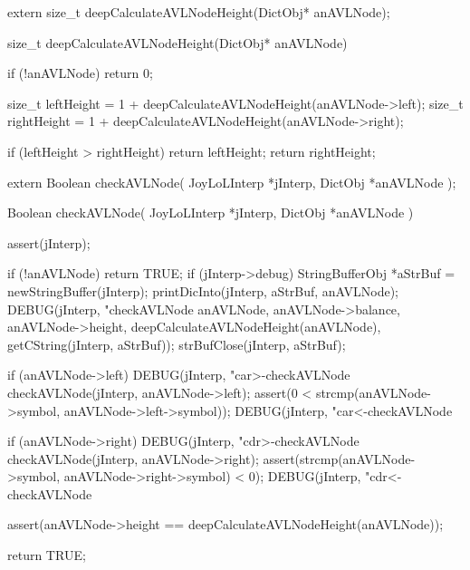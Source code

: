 \startCHeader
extern size_t deepCalculateAVLNodeHeight(DictObj* anAVLNode);
\stopCHeader

\startCCode
size_t deepCalculateAVLNodeHeight(DictObj* anAVLNode) {
  if (!anAVLNode) return 0;

  size_t leftHeight = 1 + deepCalculateAVLNodeHeight(anAVLNode->left);
  size_t rightHeight = 1 + deepCalculateAVLNodeHeight(anAVLNode->right);

  if (leftHeight > rightHeight) return leftHeight;
  return rightHeight;
}
\stopCCode

\startCHeader
extern Boolean checkAVLNode(
  JoyLoLInterp *jInterp,
  DictObj      *anAVLNode
);
\stopCHeader

\startCCode
Boolean checkAVLNode(
  JoyLoLInterp *jInterp,
  DictObj      *anAVLNode
) {
  assert(jInterp);
  
  if (!anAVLNode) return TRUE;
  if (jInterp->debug) {
    StringBufferObj *aStrBuf = 
      newStringBuffer(jInterp);
    printDicInto(jInterp, aStrBuf, anAVLNode);
    DEBUG(jInterp, "checkAVLNode %
          anAVLNode, anAVLNode->balance, anAVLNode->height,
          deepCalculateAVLNodeHeight(anAVLNode),
          getCString(jInterp, aStrBuf));
    strBufClose(jInterp, aStrBuf);
  }

  if (anAVLNode->left) {
      DEBUG(jInterp, "car>-checkAVLNode %
      checkAVLNode(jInterp, anAVLNode->left);
      assert(0 < strcmp(anAVLNode->symbol,
                      anAVLNode->left->symbol));
    DEBUG(jInterp, "car<-checkAVLNode %
  }

  if (anAVLNode->right) {
    DEBUG(jInterp, "cdr>-checkAVLNode %
    checkAVLNode(jInterp, anAVLNode->right);
    assert(strcmp(anAVLNode->symbol,
                  anAVLNode->right->symbol) < 0);
    DEBUG(jInterp, "cdr<-checkAVLNode %
  }

  assert(anAVLNode->height == deepCalculateAVLNodeHeight(anAVLNode));

  return TRUE;
}
\stopCCode

